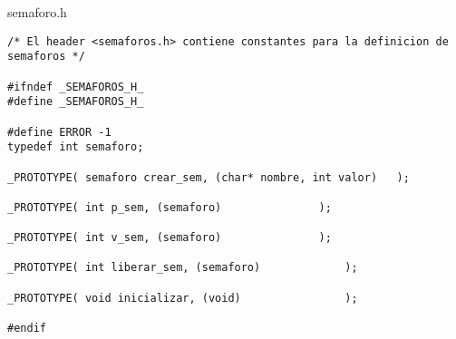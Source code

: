 semaforo.h

\begin{verbatim}
/* El header <semaforos.h> contiene constantes para la definicion de semaforos */

#ifndef _SEMAFOROS_H_
#define _SEMAFOROS_H_

#define ERROR -1
typedef int semaforo;

_PROTOTYPE( semaforo crear_sem, (char* nombre, int valor) 	);

_PROTOTYPE( int p_sem, (semaforo) 				);

_PROTOTYPE( int v_sem, (semaforo)				);

_PROTOTYPE( int liberar_sem, (semaforo)				);

_PROTOTYPE( void inicializar, (void) 				);

#endif 
\end{verbatim}
